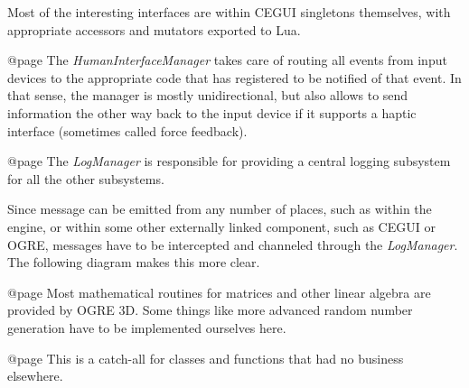 Most of the interesting interfaces are within CEGUI singletons themselves, with appropriate accessors and mutators exported to Lua.

    {}

@page 
The {\it HumanInterfaceManager} takes care of routing all events from input devices to the appropriate code that has registered to be notified of that event. In that sense, the manager is mostly unidirectional, but also allows to send information the other way back to the input device if it supports a haptic interface (sometimes called force feedback).

    {}

@page 
The {\it LogManager} is responsible for providing a central logging subsystem for all the other subsystems.

    {}
    
Since message can be emitted from any number of places, such as within the engine, or within some other externally linked component, such as CEGUI or OGRE, messages have to be intercepted and channeled through the {\it LogManager}. The following diagram makes this more clear.

    {}

@page 
Most mathematical routines for matrices and other linear algebra are provided by OGRE 3D. Some things like more advanced random number generation have to be implemented ourselves here.

    {}

@page 
This is a catch-all for classes and functions that had no business elsewhere.

    {}

